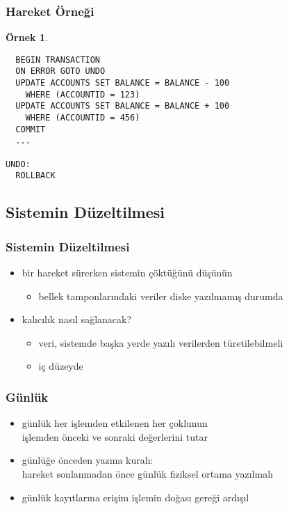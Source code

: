 \documentclass[dvipsnames]{beamer}
\theoremstyle{definition}
\theoremstyle{example}
\newtheorem{ornek}[theorem]{Örnek}
\theoremstyle{plain}
\begin{document}
\begin{frame}[fragile]
  \frametitle{Hareket Örneği}

  \begin{ornek}
    \begin{lstlisting}
  BEGIN TRANSACTION
  ON ERROR GOTO UNDO
  UPDATE ACCOUNTS SET BALANCE = BALANCE - 100
    WHERE (ACCOUNTID = 123)
  UPDATE ACCOUNTS SET BALANCE = BALANCE + 100
    WHERE (ACCOUNTID = 456)
  COMMIT
  ...

UNDO:
  ROLLBACK
    \end{lstlisting}
  \end{ornek}
\end{frame}

\subsection{Sistemin Düzeltilmesi}

\begin{frame}
  \frametitle{Sistemin Düzeltilmesi}

  \begin{itemize}
    \item bir hareket sürerken sistemin çöktüğünü düşünün
    \begin{itemize}
      \item bellek tamponlarındaki veriler diske yazılmamış durumda
    \end{itemize}

    \pause
    \item kalıcılık nasıl sağlanacak?
    \begin{itemize}
      \item veri, sistemde başka yerde yazılı verilerden türetilebilmeli
      \item iç düzeyde
    \end{itemize}
  \end{itemize}
\end{frame}

\begin{frame}
  \frametitle{Günlük}

  \begin{itemize}
    \item \alert{günlük} her işlemden etkilenen her çoklunun\\
      işlemden önceki ve sonraki değerlerini tutar

    \pause
    \medskip
    \item \alert{günlüğe önceden yazma kuralı}:\\
      hareket sonlanmadan önce günlük fiziksel ortama yazılmalı

    \pause
    \medskip
    \item günlük kayıtlarına erişim işlemin doğası gereği ardışıl
  \end{itemize}
\end{frame}
\end{document}
